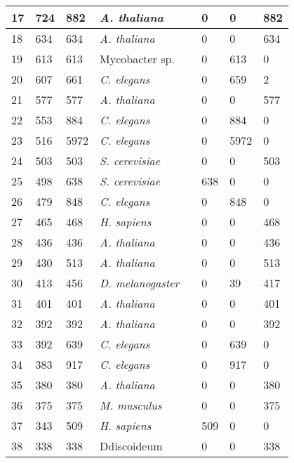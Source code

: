 \begin{longtable}[!ht]{|l|l|l|l|l|l|l|l|}
17 & 724 & 882 & \textit{A. thaliana} & \cite{pmid20061580} & 0 & 0 & 882\\ \hline
18 & 634 & 634 & \textit{A. thaliana} & \cite{pmid15028209} & 0 & 0 & 634\\ \hline
19 & 613 & 613 & Mycobacter sp. & \cite{pmid12657046} & 0 & 613 & 0\\ \hline
20 & 607 & 661 & \textit{C. elegans} & \cite{pmid17704769} & 0 & 659 & 2\\ \hline
21 & 577 & 577 & \textit{A. thaliana} & \cite{pmid17432890} & 0 & 0 & 577\\ \hline
22 & 553 & 884 & \textit{C. elegans} & \cite{pmid11231151} & 0 & 884 & 0\\ \hline
23 & 516 & 5972 & \textit{C. elegans} & \cite{pmid17417969} & 0 & 5972 & 0\\ \hline
24 & 503 & 503 & \textit{S. cerevisiae} & \cite{pmid14576278} & 0 & 0 & 503\\ \hline
25 & 498 & 638 & \textit{S. cerevisiae} & \cite{pmid16429126} & 638 & 0 & 0\\ \hline
26 & 479 & 848 & \textit{C. elegans} & \cite{pmid21529718} & 0 & 848 & 0\\ \hline
27 & 465 & 468 & \textit{H. sapiens} & \cite{pmid11256614} & 0 & 0 & 468\\ \hline
28 & 436 & 436 & \textit{A. thaliana} & \cite{pmid17644812} & 0 & 0 & 436\\ \hline
29 & 430 & 513 & \textit{A. thaliana} & \cite{pmid16618929} & 0 & 0 & 513\\ \hline
30 & 413 & 456 &  \textit{D. melanogaster} & \cite{pmid18433294} & 0 & 39 & 417\\ \hline
31 & 401 & 401 & \textit{A. thaliana} & \cite{pmid17151019} & 0 & 0 & 401\\ \hline
32 & 392 & 392 & \textit{A. thaliana} & \cite{pmid14671022} & 0 & 0 & 392\\ \hline
33 & 392 & 639 & \textit{C. elegans} & \cite{pmid12529643} & 0 & 639 & 0\\ \hline
34 & 383 & 917 & \textit{C. elegans} & \cite{pmid12445391} & 0 & 917 & 0\\ \hline
35 & 380 & 380 & \textit{A. thaliana} & \cite{pmid15539469} & 0 & 0 & 380\\ \hline
36 & 375 & 375 & \textit{M. musculus} & \cite{pmid12865426} & 0 & 0 & 375\\ \hline
37 & 343 & 509 & \textit{H. sapiens} & \cite{pmid16189514} & 509 & 0 & 0\\ \hline
38 & 338 & 338 & Ddiscoideum & \cite{pmid20422638} & 0 & 0 & 338\\ \hline

\end{longtable}
